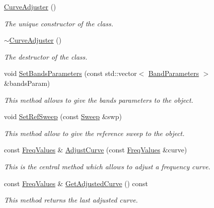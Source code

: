 \begin{DoxyCompactItemize}
\item 
\mbox{\label{classCurveAdjuster_a200e4c6f01360a11d7db776e1aeb3048}} 
\hyperlink{classCurveAdjuster_a200e4c6f01360a11d7db776e1aeb3048}{Curve\+Adjuster} ()
\begin{DoxyCompactList}\small\item\em The unique constructor of the class. \end{DoxyCompactList}\item 
\hyperlink{classCurveAdjuster_ae1939fed50d532e46bef47db5e3883c3}{$\sim$\+Curve\+Adjuster} ()
\begin{DoxyCompactList}\small\item\em The destructor of the class. \end{DoxyCompactList}\item 
void \hyperlink{classCurveAdjuster_a17080bae5109c5128caa4c214b856e19}{Set\+Bands\+Parameters} (const std\+::vector$<$ \hyperlink{structBandParameters}{Band\+Parameters} $>$ \&bands\+Param)
\begin{DoxyCompactList}\small\item\em This method allows to give the bands\textquotesingle{} parameters to the object. \end{DoxyCompactList}\item 
void \hyperlink{classCurveAdjuster_a5865916cf99ab2cad0a7a9bc2b4e1d56}{Set\+Ref\+Sweep} (const \hyperlink{structSweep}{Sweep} \&swp)
\begin{DoxyCompactList}\small\item\em This method allow to give the reference sweep to the object. \end{DoxyCompactList}\item 
const \hyperlink{structFreqValues}{Freq\+Values} \& \hyperlink{classCurveAdjuster_a3645614620645c7bfd86386576072d0a}{Adjust\+Curve} (const \hyperlink{structFreqValues}{Freq\+Values} \&curve)
\begin{DoxyCompactList}\small\item\em This is the central method which allows to adjust a frequency curve. \end{DoxyCompactList}\item 
\mbox{\label{classCurveAdjuster_a613e815a190d44b7d64e70b08da82e1f}} 
const \hyperlink{structFreqValues}{Freq\+Values} \& \hyperlink{classCurveAdjuster_a613e815a190d44b7d64e70b08da82e1f}{Get\+Adjusted\+Curve} () const
\begin{DoxyCompactList}\small\item\em This method returns the last adjusted curve. \end{DoxyCompactList}\end{DoxyCompactItemize}


